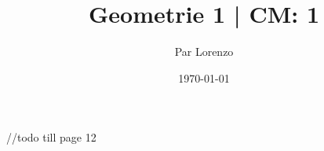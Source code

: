 \documentclass[a4paper, 12pt]{article}
\title{Geometrie 1 | CM: 1}
\author{Par Lorenzo}
\date{\today}
\begin{document}
\maketitle

//todo till page 12
\end{document}
